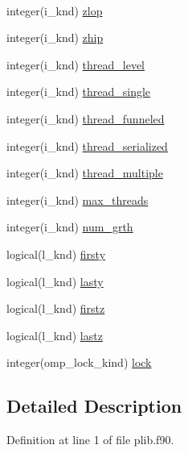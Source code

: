 \begin{DoxyCompactItemize}
$$\item 
integer(i\-\_\-knd) \hyperlink{classplib__module_a3a7c2d7b52bbd28281bd1affd1d50bf1}{zlop}
\item 
integer(i\-\_\-knd) \hyperlink{classplib__module_ac18f767501ee98501fbf13da3185aae7}{zhip}
\item 
integer(i\-\_\-knd) \hyperlink{classplib__module_a704c693732d15c474f76b340e3b1c54f}{thread\-\_\-level}
\item 
integer(i\-\_\-knd) \hyperlink{classplib__module_a976973aed6846d0da2cc7fc29e0f0097}{thread\-\_\-single}
\item 
integer(i\-\_\-knd) \hyperlink{classplib__module_aaf61faf216e801843c4b8121eab84956}{thread\-\_\-funneled}
\item 
integer(i\-\_\-knd) \hyperlink{classplib__module_a117ac57a3b41c9fae508f8674fe45f0f}{thread\-\_\-serialized}
\item 
integer(i\-\_\-knd) \hyperlink{classplib__module_af4045f02bfdd6ce98120023046d4c1ca}{thread\-\_\-multiple}
\item 
integer(i\-\_\-knd) \hyperlink{classplib__module_aac421ecf4251867c4bff7045095d596c}{max\-\_\-threads}
\item 
integer(i\-\_\-knd) \hyperlink{classplib__module_a8238cefc81a445bee3e137bb94f75e91}{num\-\_\-grth}
\item 
logical(l\-\_\-knd) \hyperlink{classplib__module_acacb5f9f63dcc742ef176b99534fe626}{firsty}
\item 
logical(l\-\_\-knd) \hyperlink{classplib__module_ac8204e5b33211c1fe40e991a11d63f95}{lasty}
\item 
logical(l\-\_\-knd) \hyperlink{classplib__module_a2d791ed6cdd38a29604dcb99a7a556fe}{firstz}
\item 
logical(l\-\_\-knd) \hyperlink{classplib__module_a5d6addca95cdb6299949d278355bed3b}{lastz}
\item 
integer(omp\-\_\-lock\-\_\-kind) \hyperlink{classplib__module_a3f4964cd381feb76e21407e3b96915c9}{lock}
\end{DoxyCompactItemize}


\subsection{Detailed Description}


Definition at line 1 of file plib.\-f90.



